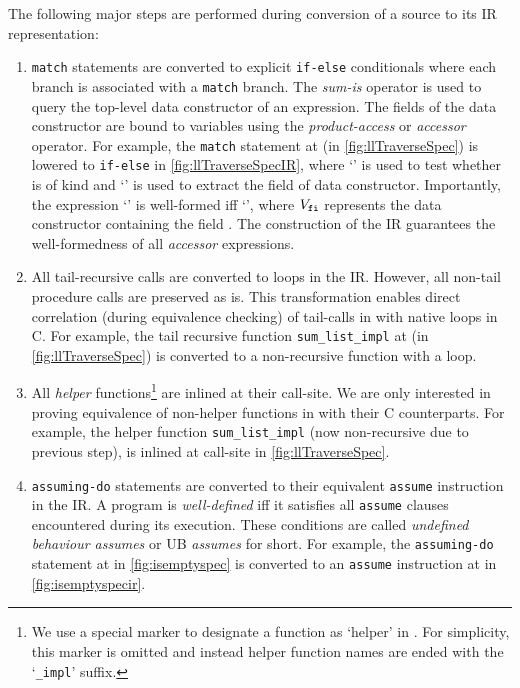 The following major steps are performed during conversion of a \SpecL{} source to its IR representation:
\begin{enumerate}
\item {\tt match} statements are converted to explicit {\tt if-else} conditionals where each branch is
associated with a {\tt match} branch. The {\em sum-is} operator is used to query
the top-level data constructor of an expression. The fields of the data constructor are bound to
variables using the {\em product-access} or {\em accessor} operator.
For example, the {\tt match} statement at  (in \cref{fig:llTraverseSpec}) is lowered to {\tt if-else}
in \cref{fig:llTraverseSpecIR}, where `' is used to test whether  is
of kind  and `' is used to extract the  field of  data constructor.
Importantly, the expression `' is well-formed iff `', where $V_{{\tt fi}}$ represents the
data constructor containing the field .
The construction of the IR guarantees the well-formedness of all {\em accessor} expressions.
\item All tail-recursive calls are converted to loops in the IR. However, all non-tail procedure calls are preserved as is.
This transformation enables direct correlation (during equivalence checking) of tail-calls in \SpecL{} with native loops in C.
For example, the tail recursive function {\tt sum\_list\_impl} at  (in \cref{fig:llTraverseSpec}) is converted to a non-recursive function with a loop.
\item All {\em helper} functions\footnote{We use a special marker to designate a function as `helper' in \SpecL{}.
For simplicity, this marker is omitted and instead helper function names are ended with the `{\tt \_impl}' suffix.}
are inlined at their call-site.
We are only interested in proving equivalence of non-helper functions in \SpecL{} with their C counterparts.
For example, the helper function {\tt sum\_list\_impl} (now non-recursive due to previous step), is inlined
at call-site  in \cref{fig:llTraverseSpec}.
\item {\tt assuming-do} statements are converted to their equivalent {\tt assume} instruction in the IR.
A \SpecL{} program is {\em well-defined} iff it satisfies all {\tt assume} clauses encountered during its execution.
These conditions are called {\em undefined behaviour assumes} or UB {\em assumes} for short.
For example, the {\tt assuming-do} statement at  in \cref{fig:isemptyspec} is converted to an {\tt assume}
instruction at  in \cref{fig:isemptyspecir}.
\end{enumerate}

